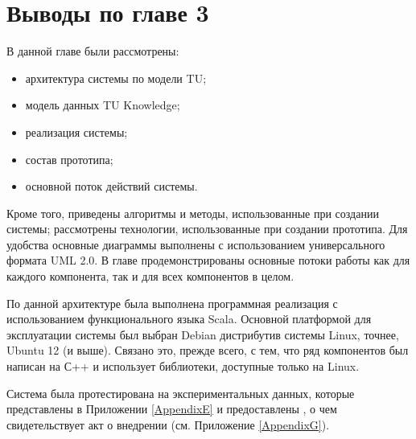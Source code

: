 \section{Выводы по главе 3}
В данной главе были рассмотрены:
\begin{itemize}
	\item архитектура системы по модели TU;
	\item модель данных TU Knowledge;
	\item реализация системы;
	\item состав прототипа;
	\item основной поток действий системы.
\end{itemize} \par
Кроме того, приведены алгоритмы и методы, использованные при создании системы; рассмотрены технологии, использованные при создании прототипа. Для удобства основные диаграммы выполнены с использованием универсального формата UML 2.0. В главе продемонстрированы основные потоки работы как для каждого компонента, так и для всех компонентов в целом. \par
По данной архитектуре была выполнена программная реализация с использованием функционального языка Scala. Основной платформой для эксплуатации системы был выбран Debian дистрибутив системы Linux, точнее, Ubuntu 12 (и выше). Связано это, прежде всего, с тем, что ряд компонентов был написан на С++ и использует библиотеки, доступные только на Linux.  \par
Система была протестирована на экспериментальных данных, которые представлены в Приложении \ref{AppendixE} и предоставлены \icl, о чем свидетельствует акт о внедрении (см. Приложение \ref{AppendixG}).


\clearpage